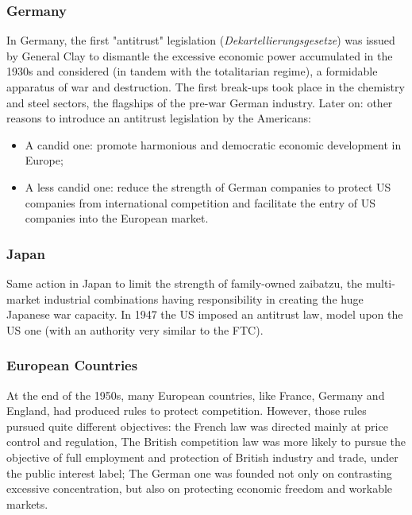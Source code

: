         \subsubsection{Germany}

            In Germany, the first "antitrust" legislation (\textit{Dekartellierungsgesetze}) was issued by General Clay to dismantle the excessive economic power accumulated in the 1930s and considered (in tandem with the totalitarian regime), a formidable apparatus of war and destruction. The first break-ups took place in the chemistry and steel sectors, the flagships of the pre-war German industry. 
            Later on: other reasons to introduce an antitrust legislation by the Americans:  
            \begin{itemize}
                \item A candid one: promote harmonious and democratic economic development in Europe;
                \item A less candid one: reduce the strength of German companies to protect US companies from international competition and facilitate the entry of US companies into the European market.
            \end{itemize}

        \subsubsection{Japan}

            Same action in Japan to limit the strength of family-owned zaibatzu, the multi-market industrial combinations having responsibility in creating the huge Japanese war capacity. In 1947 the US imposed an antitrust law, model upon the US one (with an authority very similar to the FTC).

        \subsubsection{European Countries}

            At the end of the 1950s, many European countries, like France, Germany and England, had produced rules to protect competition. 
            However, those rules pursued quite different objectives: the French law was directed mainly at price control and regulation, 
            The British competition law was more likely to pursue the objective of full employment and protection of British industry and trade, under the public interest label; 
            The German one was founded not only on contrasting excessive concentration, but also on protecting economic freedom and workable markets.

